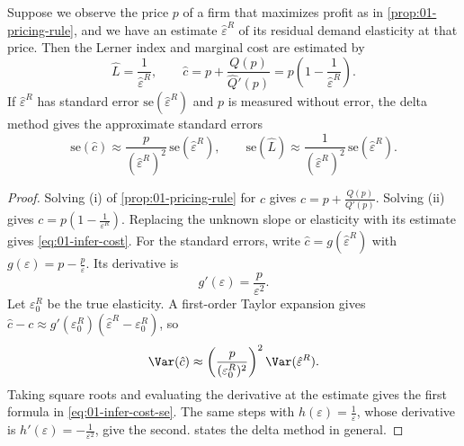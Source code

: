 \begin{corollary}\label{prop:01-infer-cost}
Suppose we observe the price $p$ of a firm that maximizes profit as in \cref{prop:01-pricing-rule}, and we have
an estimate $\hat\varepsilon^R$ of its residual demand elasticity at that price. Then the Lerner index and
marginal cost are estimated by
\begin{equation}\label{eq:01-infer-cost}
  \hat L = \frac{1}{\hat\varepsilon^R}, \qquad
  \hat c = p + \frac{Q(p)}{\hat Q'(p)} = p\left(1 - \frac{1}{\hat\varepsilon^R}\right).
\end{equation}
If $\hat\varepsilon^R$ has standard error $\mathrm{se}(\hat\varepsilon^R)$ and $p$ is measured without error,
the delta method gives the approximate standard errors
\begin{equation}\label{eq:01-infer-cost-se}
  \mathrm{se}(\hat c) \approx \frac{p}{(\hat\varepsilon^R)^2}\,\mathrm{se}(\hat\varepsilon^R), \qquad
  \mathrm{se}(\hat L) \approx \frac{1}{(\hat\varepsilon^R)^2}\,\mathrm{se}(\hat\varepsilon^R).
\end{equation}
\end{corollary}

\begin{proof}
Solving (i) of \cref{prop:01-pricing-rule} for $c$ gives $c = p + \frac{Q(p)}{Q'(p)}$. Solving (ii) gives
$c = p\left(1 - \frac{1}{\varepsilon^R}\right)$. Replacing the unknown slope or elasticity with its estimate
gives \eqref{eq:01-infer-cost}. For the standard errors, write $\hat c = g(\hat\varepsilon^R)$ with
$g(\varepsilon) = p - \frac{p}{\varepsilon}$. Its derivative is
\[
  g'(\varepsilon) = \frac{p}{\varepsilon^2} .
\]
Let $\varepsilon^R_0$ be the true elasticity. A first-order Taylor expansion gives
$\hat c - c \approx g'(\varepsilon^R_0)\left(\hat\varepsilon^R - \varepsilon^R_0\right)$, so
\[
  \Var(\hat c) \approx \left(\frac{p}{(\varepsilon^R_0)^2}\right)^2 \Var(\hat\varepsilon^R) .
\]
Taking square roots and evaluating the derivative at the estimate gives the first formula in
\eqref{eq:01-infer-cost-se}. The same steps with $h(\varepsilon) = \frac{1}{\varepsilon}$, whose derivative is
$h'(\varepsilon) = -\frac{1}{\varepsilon^2}$, give the second.  states the delta method
in general.
\end{proof}

